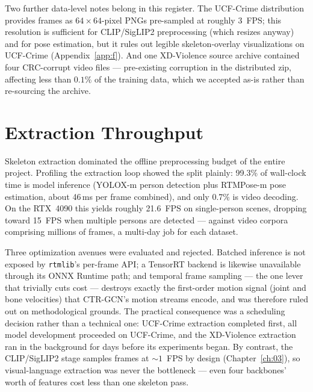 Two further data-level notes belong in this register. The UCF-Crime
distribution provides frames as $64\times64$-pixel PNGs pre-sampled at roughly
3~FPS; this resolution is sufficient for CLIP/SigLIP2 preprocessing (which
resizes anyway) and for pose estimation, but it rules out legible
skeleton-overlay visualizations on UCF-Crime (Appendix~\ref{app:f}). And one
XD-Violence source archive contained four CRC-corrupt video files ---
pre-existing corruption in the distributed zip, affecting less than $0.1\%$ of
the training data, which we accepted as-is rather than re-sourcing the
archive.

\section{Extraction Throughput}
\label{sec:appd-throughput}

Skeleton extraction dominated the offline preprocessing budget of the entire
project. Profiling the extraction loop showed the split plainly: 99.3\% of
wall-clock time is model inference (YOLOX-m person detection plus RTMPose-m
pose estimation, about 46\,ms per frame combined), and only 0.7\% is video
decoding. On the RTX~4090 this yields roughly 21.6~FPS on single-person
scenes, dropping toward 15~FPS when multiple persons are detected --- against
video corpora comprising millions of frames, a multi-day job for each dataset.

Three optimization avenues were evaluated and rejected. Batched inference is
not exposed by \texttt{rtmlib}'s per-frame API; a TensorRT backend is likewise
unavailable through its ONNX Runtime path; and temporal frame sampling --- the
one lever that trivially cuts cost --- destroys exactly the first-order motion
signal (joint and bone velocities) that CTR-GCN's motion streams encode, and
was therefore ruled out on methodological grounds. The practical consequence
was a scheduling decision rather than a technical one: UCF-Crime extraction
completed first, all model development proceeded on UCF-Crime, and the
XD-Violence extraction ran in the background for days before its experiments
began. By contrast, the CLIP/SigLIP2 stage samples frames at ${\sim}1$~FPS by
design (Chapter~\ref{ch:03}), so visual-language extraction was never the
bottleneck --- even four backbones' worth of features cost less than one
skeleton pass.

